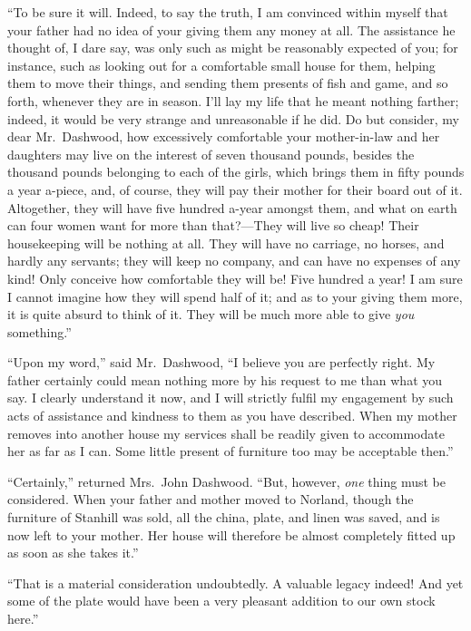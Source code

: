 \documentclass{article}
\begin{document}
``To be sure it will.  Indeed, to say the truth,
I am convinced within myself that your father had no idea
of your giving them any money at all.  The assistance
he thought of, I dare say, was only such as might be
reasonably expected of you; for instance, such as looking
out for a comfortable small house for them, helping them
to move their things, and sending them presents of fish
and game, and so forth, whenever they are in season.
I'll lay my life that he meant nothing farther; indeed,
it would be very strange and unreasonable if he did.
Do but consider, my dear Mr.\ Dashwood, how excessively
comfortable your mother-in-law and her daughters may live
on the interest of seven thousand pounds, besides the
thousand pounds belonging to each of the girls, which brings
them in fifty pounds a year a-piece, and, of course,
they will pay their mother for their board out of it.
Altogether, they will have five hundred a-year amongst them,
and what on earth can four women want for more than
that?---They will live so cheap! Their housekeeping will
be nothing at all.  They will have no carriage, no horses,
and hardly any servants; they will keep no company,
and can have no expenses of any kind!  Only conceive
how comfortable they will be!  Five hundred a year! I am
sure I cannot imagine how they will spend half of it;
and as to your giving them more, it is quite absurd to think
of it.  They will be much more able to give \emph{you} something.''

``Upon my word,'' said Mr.\ Dashwood, ``I believe you
are perfectly right.  My father certainly could mean
nothing more by his request to me than what you say.
I clearly understand it now, and I will strictly fulfil
my engagement by such acts of assistance and kindness
to them as you have described.  When my mother removes
into another house my services shall be readily given
to accommodate her as far as I can.  Some little present
of furniture too may be acceptable then.''

``Certainly,'' returned Mrs.\ John Dashwood.  ``But, however,
\emph{one} thing must be considered.  When your father and mother
moved to Norland, though the furniture of Stanhill
was sold, all the china, plate, and linen was saved,
and is now left to your mother.  Her house will therefore
be almost completely fitted up as soon as she takes it.''

``That is a material consideration undoubtedly.
A valuable legacy indeed! And yet some of the plate would
have been a very pleasant addition to our own stock here.''
\end{document}
